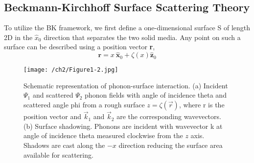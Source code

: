\subsection{Beckmann-Kirchhoff Surface Scattering Theory}
To utilize the BK framework, we first define a one-dimensional surface S of length 2D in the ${\hat{x}}_0$ direction that separates the two solid media. Any point on such a surface can be described using a position vector \textbf{r}, 
\begin{equation}\label{eq:ch2-1} 
\mathbf{r}=x{\ \hat{\mathbf{x}}}_0+\zeta\left(x\right){\hat{\mathbf{z}}}_0                                         
\end{equation}
\begin{figure}[hbt]
	\centering \texttt{[image: /ch2/Figure1-2.jpg]}
	\caption{Schematic representation of phonon-surface interaction. (a) Incident $\Psi_{1}$ and scattered $\Psi_{2}$ phonon fields with angle of incidence \gls{theta} and scattered angle \gls{phi} from a rough surface $z = \zeta (\vec{r})$, where \gls{r} is the position vector and $\vec{k}_{1}$ and $\vec{k}_{2}$ are the corresponding wavevectors. (b) Surface shadowing. Phonons are incident with wavevector \gls{k} at angle of incidence \gls{theta} measured clockwise from the $z$ axis. Shadows are cast along the $-x$ direction reducing the surface area available for scattering.}
	\label{fig:ch2-bk_schematic2}
\end{figure}

